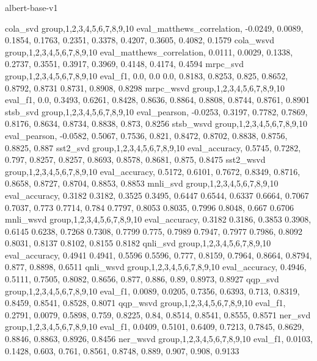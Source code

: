 albert-base-v1

cola_svd
group,1,2,3,4,5,6,7,8,9,10
eval_matthews_correlation, -0.0249, 0.0089, 0.1854, 0.1763, 0.2351, 0.3378, 0.4207, 0.3605, 0.4082, 0.1579
cola_wsvd
group,1,2,3,4,5,6,7,8,9,10
eval_matthews_correlation, 0.0111, 0.0029, 0.1338, 0.2737, 0.3551, 0.3917, 0.3969, 0.4148, 0.4174, 0.4594
mrpc_svd
group,1,2,3,4,5,6,7,8,9,10
eval_f1, 0.0, 0.0 0.0, 0.8183, 0.8253, 0.825, 0.8652, 0.8792, 0.8731 0.8731, 0.8908, 0.8298
mrpc_wsvd
group,1,2,3,4,5,6,7,8,9,10
eval_f1, 0.0, 0.3493, 0.6261, 0.8428, 0.8636, 0.8864, 0.8808, 0.8744, 0.8761, 0.8901
stsb_svd
group,1,2,3,4,5,6,7,8,9,10
eval_pearson, -0.0253, 0.3197, 0.7782, 0.7869, 0.8176, 0.8634, 0.8734, 0.8838, 0.873, 0.8256
stsb_wsvd
group,1,2,3,4,5,6,7,8,9,10
eval_pearson, -0.0582, 0.5067, 0.7536, 0.821, 0.8472, 0.8702, 0.8838, 0.8756, 0.8825, 0.887
sst2_svd
group,1,2,3,4,5,6,7,8,9,10
eval_accuracy, 0.5745, 0.7282, 0.797, 0.8257, 0.8257, 0.8693, 0.8578, 0.8681, 0.875, 0.8475
sst2_wsvd
group,1,2,3,4,5,6,7,8,9,10
eval_accuracy, 0.5172, 0.6101, 0.7672, 0.8349, 0.8716, 0.8658, 0.8727, 0.8704, 0.8853, 0.8853
mnli_svd
group,1,2,3,4,5,6,7,8,9,10
eval_accuracy, 0.3182 0.3182, 0.3525 0.3495, 0.6447 0.6544, 0.6337 0.6664, 0.7067 0.7037, 0.773 0.7714, 0.784 0.7797, 0.8053 0.8035, 0.7996 0.8048, 0.667 0.6706
mnli_wsvd
group,1,2,3,4,5,6,7,8,9,10
eval_accuracy, 0.3182 0.3186, 0.3853 0.3908, 0.6145 0.6238, 0.7268 0.7308, 0.7799 0.775, 0.7989 0.7947, 0.7977 0.7986, 0.8092 0.8031, 0.8137 0.8102, 0.8155 0.8182
qnli_svd
group,1,2,3,4,5,6,7,8,9,10
eval_accuracy, 0.4941 0.4941, 0.5596 0.5596, 0.777, 0.8159, 0.7964, 0.8664, 0.8794, 0.877, 0.8898, 0.6511
qnli_wsvd
group,1,2,3,4,5,6,7,8,9,10
eval_accuracy, 0.4946, 0.5111, 0.7505, 0.8082, 0.8656, 0.877, 0.886, 0.89, 0.8973, 0.8927
qqp_svd
group,1,2,3,4,5,6,7,8,9,10
eval_f1, 0.0089, 0.0205, 0.7356, 0.6393, 0.713, 0.8319, 0.8459, 0.8541, 0.8528, 0.8071
qqp_wsvd
group,1,2,3,4,5,6,7,8,9,10
eval_f1, 0.2791, 0.0079, 0.5898, 0.759, 0.8225, 0.84, 0.8514, 0.8541, 0.8555, 0.8571
ner_svd
group,1,2,3,4,5,6,7,8,9,10
eval_f1, 0.0409, 0.5101, 0.6409, 0.7213, 0.7845, 0.8629, 0.8846, 0.8863, 0.8926, 0.8456
ner_wsvd
group,1,2,3,4,5,6,7,8,9,10
eval_f1, 0.0103, 0.1428, 0.603, 0.761, 0.8561, 0.8748, 0.889, 0.907, 0.908, 0.9133


